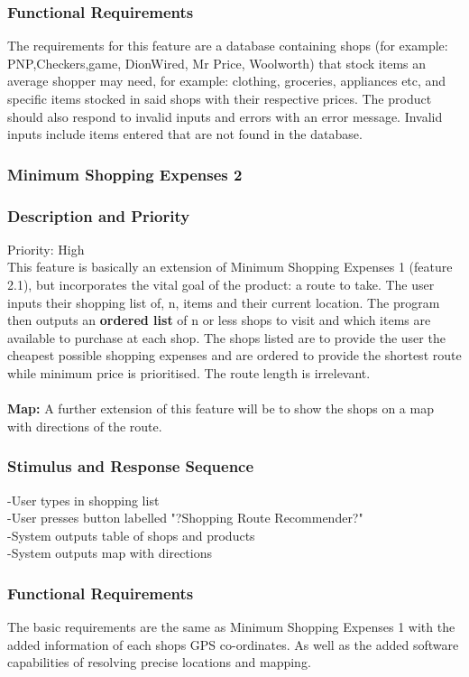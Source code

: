 \documentclass[12pt]{article}
\begin{document}
 \subsubsection*{Functional Requirements}
 The requirements for this feature are a database  containing shops (for example: PNP,Checkers,game, DionWired, Mr Price, Woolworth) that stock items an average shopper may need, for example: clothing, groceries, appliances etc, and specific items stocked in said shops with their respective prices. The product should also respond to invalid inputs and errors with an error message. Invalid inputs include items entered that are not found in the database.
 
 \subsubsection{Minimum Shopping Expenses 2}
\subsubsection*{Description and Priority}
 Priority: High\\
 This feature is basically an extension of Minimum Shopping Expenses 1 (feature 2.1), but incorporates the vital goal of the product: a route to take. The user inputs their shopping list of, n, items and their current location. The program then outputs an \textbf{ordered list} of n or less shops to visit and which items are available to purchase at each shop. The shops listed are to provide the user the cheapest possible shopping expenses and are ordered to provide the shortest route while minimum price is prioritised. The route length is irrelevant. 
\\\\
\textbf{Map:} A further extension of this feature will be to show the shops on a map with directions of the route.
 \subsubsection*{Stimulus and Response Sequence}
-User types in shopping list\\
-User presses button labelled "?Shopping Route Recommender?"\\
-System outputs table of shops and products\\
-System outputs map with directions\\
 \subsubsection*{Functional Requirements}
 The basic requirements are the same as Minimum Shopping Expenses 1 with the added information of each shops GPS co-ordinates. As well as the added software capabilities of resolving precise locations and mapping.
 
\end{document}
